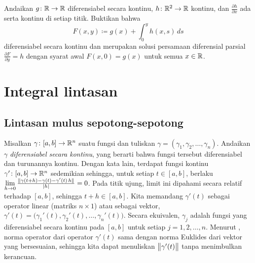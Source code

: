 \begin{exercise}
Andaikan $g \colon {\mathbb{R}} \to {\mathbb{R}}$ diferensiabel secara kontinu,
$h \colon {\mathbb{R}}^2 \to {\mathbb{R}}$ kontinu, dan
$\frac{\partial h}{\partial x}$ ada serta kontinu di setiap titik.  Buktikan bahwa
\begin{equation*}
F(x,y) \coloneqq g(x) + \int_0^y h(x,s) \,ds
\end{equation*}
diferensiabel secara kontinu dan merupakan solusi persamaan diferensial parsial
$\frac{\partial F}{\partial y} = h$ dengan syarat awal
$F(x,0) = g(x)$ untuk semua $x \in {\mathbb{R}}$.
\end{exercise}


\sectionnewpage
\section{Integral lintasan}
\label{sec:pathintegral}



\subsection{Lintasan mulus sepotong-sepotong}

Misalkan $\gamma \colon [a,b] \to {\mathbb{R}}^n$ suatu fungsi dan tuliskan
$\gamma = (\gamma_1,\gamma_2,\ldots,\gamma_n)$. 
Andaikan $\gamma$ 
\emph{diferensiabel secara kontinu},
yang berarti bahwa fungsi tersebut diferensiabel dan turunannya kontinu.
Dengan kata lain, terdapat fungsi kontinu $\gamma' \colon [a,b]
\to {\mathbb{R}}^n$ sedemikian sehingga, untuk setiap $t \in [a,b]$, berlaku
$\lim\limits_{h \to 0}
\frac{\lVert {\gamma(t+h)-\gamma(t) - \gamma'(t) \, h} \rVert}{\lvert {h} \rvert} = 0$.
Pada titik ujung, limit ini dipahami secara relatif terhadap $[a,b]$,
sehingga $t+h \in [a,b]$.
Kita memandang
$\gamma'(t)$ sebagai operator linear (matriks $n \times 1$) atau sebagai
vektor,
$\gamma'(t) =
\bigl( \gamma_1'(t), \gamma_2'(t), \ldots, \gamma_n'(t) \bigr)$.
Secara ekuivalen, 
$\gamma_j$ adalah fungsi yang diferensiabel secara kontinu pada $[a,b]$
untuk setiap $j=1,2,\ldots,n$.
Menurut , norma operator dari
operator $\gamma'(t)$ sama dengan
norma Euklides dari vektor yang bersesuaian, sehingga kita dapat menuliskan 
$\bigl\lVert {\gamma'(t)} \bigr\rVert$ tanpa menimbulkan kerancuan.


